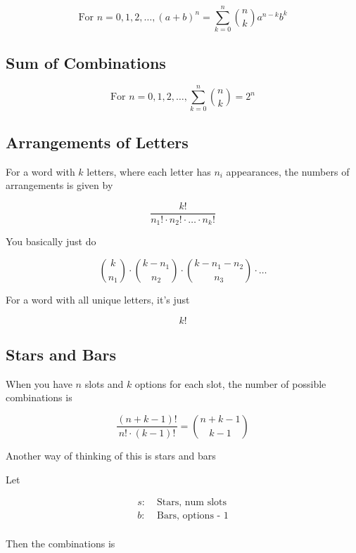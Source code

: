 \documentclass[../../Main.tex]{subfiles}
\begin{document}
\begin{theorem}
    
    $$\text{For } n = 0, 1, 2, \ldots, (a + b)^n = \sum_{k = 0}^{n} {n \choose k} a^{n - k}b^k$$

\end{theorem}

\subsection{Sum of Combinations}

\begin{theorem}
    $$\text{For } n = 0, 1, 2, \ldots, \sum_{k = 0}^{n}{n \choose k} = 2^n$$
\end{theorem}

\subsection{Arrangements of Letters}

For a word with $k$ letters, where each letter has $n_i$ appearances, the numbers of arrangements is given by

$$ \frac{k!}{n_1! \cdot n_2! \cdot \ldots \cdot n_k!}$$

You basically just do

$$ {k \choose n_1} \cdot {k - n_1 \choose n_2} \cdot {k - n_1 - n_2 \choose n_3} \cdot \ldots$$

For a word with all unique letters, it's just

$$k!$$

\subsection{Stars and Bars}

When you have $n$ slots and $k$ options for each slot, the number of possible combinations is 

$$\frac{(n + k - 1)!}{n! \cdot (k - 1)!} = {n + k - 1 \choose k - 1}$$

Another way of thinking of this is stars and bars

Let

\begin{align*}
    s: &\; \text{Stars, num slots} \\
    b: &\; \text{Bars, options - 1} \\
\end{align*}

Then the combinations is
\end{document}
